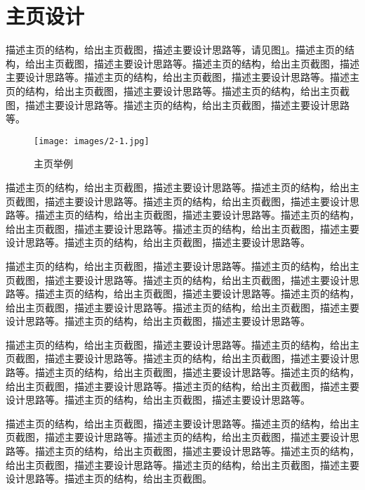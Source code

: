 \documentclass[supercite]{Experimental_Report}
\theoremstyle{definition}
\begin{document}
\newpage

\section{主页设计}

描述主页的结构，给出主页截图，描述主要设计思路等，请见图\ref{fig2-1}。描述主页的结构，给出主页截图，描述主要设计思路等。描述主页的结构，给出主页截图，描述主要设计思路等。描述主页的结构，给出主页截图，描述主要设计思路等。描述主页的结构，给出主页截图，描述主要设计思路等。描述主页的结构，给出主页截图，描述主要设计思路等。描述主页的结构，给出主页截图，描述主要设计思路等。

\begin{figure}[htb]
	\begin{center}
		\texttt{[image: images/2-1.jpg]}
		\caption{主页举例}
		\label{fig2-1}
	\end{center}
\end{figure}

描述主页的结构，给出主页截图，描述主要设计思路等。描述主页的结构，给出主页截图，描述主要设计思路等。描述主页的结构，给出主页截图，描述主要设计思路等。描述主页的结构，给出主页截图，描述主要设计思路等。描述主页的结构，给出主页截图，描述主要设计思路等。描述主页的结构，给出主页截图，描述主要设计思路等。描述主页的结构，给出主页截图，描述主要设计思路等。

描述主页的结构，给出主页截图，描述主要设计思路等。描述主页的结构，给出主页截图，描述主要设计思路等。描述主页的结构，给出主页截图，描述主要设计思路等。描述主页的结构，给出主页截图，描述主要设计思路等。描述主页的结构，给出主页截图，描述主要设计思路等。描述主页的结构，给出主页截图，描述主要设计思路等。描述主页的结构，给出主页截图，描述主要设计思路等。

描述主页的结构，给出主页截图，描述主要设计思路等。描述主页的结构，给出主页截图，描述主要设计思路等。描述主页的结构，给出主页截图，描述主要设计思路等。描述主页的结构，给出主页截图，描述主要设计思路等。描述主页的结构，给出主页截图，描述主要设计思路等。描述主页的结构，给出主页截图，描述主要设计思路等。描述主页的结构，给出主页截图，描述主要设计思路等。

描述主页的结构，给出主页截图，描述主要设计思路等。描述主页的结构，给出主页截图，描述主要设计思路等。描述主页的结构，给出主页截图，描述主要设计思路等。描述主页的结构，给出主页截图，描述主要设计思路等。描述主页的结构，给出主页截图，描述主要设计思路等。描述主页的结构，给出主页截图，描述主要设计思路等。描述主页的结构，给出主页截图。

\newpage
\end{document}
